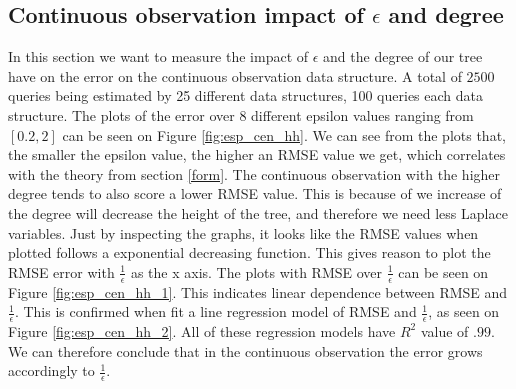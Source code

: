 \documentclass[11pt]{article}
\theoremstyle{definition}
\begin{document}
\newpage \subsection{Continuous observation impact of $\epsilon$ and degree}
In this section we want to measure the impact of $\epsilon$ and the degree of our tree have on the error on the continuous observation data structure. A total of $2500$ queries being estimated by 25 different data structures, 100 queries each data structure. The plots of the error over 8 different epsilon values ranging from $[0.2,2]$ can be seen on Figure \ref{fig:esp_cen_hh}. We can see from the plots that, the smaller the epsilon value, the higher an RMSE value we get, which correlates with the theory from section \ref{form}. The continuous observation with the higher degree tends to also score a lower RMSE value. This is because of we increase of the degree will decrease the height of the tree, and therefore we need less Laplace variables. Just by inspecting the graphs, it looks like the RMSE values when plotted follows a exponential decreasing function. This gives reason to plot the RMSE error with  $\frac{1}{\epsilon}$ as the x axis. The plots with RMSE over $\frac{1}{\epsilon}$ can be seen on Figure \ref{fig:esp_cen_hh_1}. This indicates linear dependence between RMSE and $\frac{1}{\epsilon}$. This is confirmed when fit a line regression model of RMSE and $\frac{1}{\epsilon}$, as seen on Figure \ref{fig:esp_cen_hh_2}. All of these regression models have $R^2$ value of $.99$. We can therefore conclude that in the continuous observation the error grows accordingly to $\frac{1}{\epsilon}$.
\end{document}

